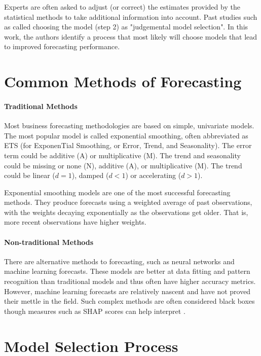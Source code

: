 \documentclass[12pt]{article}
\begin{document}
Experts are often asked to adjust (or correct) the estimates provided by the statistical methods to take additional information into account. Past studies such as \cite{bunn1991interaction} called choosing the model (step 2) as "judgemental model selection". In this work, the authors identify a process that most likely will choose models that lead to improved forecasting performance.


\section{Common Methods of Forecasting}

\paragraph{Traditional Methods} Most business forecasting methodologies are based on simple, univariate models. The most popular model is called exponential smoothing, often abbreviated as ETS (for ExponenTial Smoothing, or Error, Trend, and Seasonality). The error term could be additive (A) or multiplicative (M). The trend and seasonality could be missing or none (N), additive (A), or multiplicative (M). The trend could be linear ($d = 1$), damped ($d < 1$) or accelerating ($d > 1$).

Exponential smoothing models are one of the most successful forecasting methods. They produce forecasts using a weighted average of past observations, with the weights decaying exponentially as the observations get older. That is, more recent observations have higher weights.

\paragraph{Non-traditional Methods} There are alternative methods to forecasting, such as neural networks and machine learning forecasts. These models are better at data fitting and pattern recognition than traditional models and thus often have higher accuracy metrics. However, machine learning forecasts are relatively nascent and have not proved their mettle in the field. Such complex methods are often considered black boxes though measures such as SHAP scores can help interpret \citep{lundberg2017}.

\section{Model Selection Process}
\end{document}
